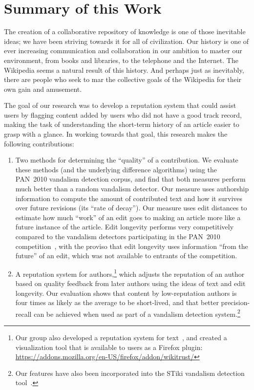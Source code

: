 \section{Summary of this Work}

The creation of a collaborative repository of knowledge is
one of those inevitable ideas; we have been striving towards it
for all of civilization.
Our history is one of ever increasing communication and collaboration
in our ambition to master our environment, from books and libraries,
to the telephone and the Internet.
The Wikipedia seems a natural result of this history.
And perhaps just as inevitably, there are people who seek to
mar the collective goals of the Wikipedia for their own gain and amusement.

The goal of our research was to develop a reputation system
that could assist users by flagging content added by users who
did not have a good track record, making the task of understanding
the short-term history of an article easier to grasp with a glance.
In working towards that goal, this research makes the following contributions:
\begin{enumerate}

\item Two methods for determining the ``quality'' of a contribution.
  We evaluate these methods (and the underlying difference algorithms)
  using the PAN~2010 vandalism detection corpus, and find that both
  measures perform much better than a random vandalism detector.
  Our  measure uses authorship information to
  compute the amount of contributed text and how it survives over
  future revisions (its ``rate of decay'').
  Our  measure uses edit distances to estimate
  how much ``work'' of an edit goes to making an article more like a
  future instance of the article.
  Edit longevity performs very competitively
  compared to the vandalism detectors participating in the
  PAN~2010 competition~\cite{Potthast2010b}, with the proviso that
  edit longevity uses information ``from the future'' of an edit,
  which was not available to entrants of the competition.

\item A reputation system for authors,\footnote{Our group also
  developed a reputation system for text~\cite{Adler2008b},
  and created a visualization
  tool that is available to users as a Firefox plugin:
  \url{https://addons.mozilla.org/en-US/firefox/addon/wikitrust/}}
  which adjusts the reputation of an author based on quality feedback
  from later authors using the ideas of text and edit longevity.
  Our evaluation shows that content by low-reputation authors is
  four times as likely as the average to be short-lived, and that better
  precision-recall can be achieved when used as part of a vandalism
  detection system.\footnote{Our features have also been incorporated
  into the STiki vandalism detection tool~\cite{wiki:STiki}.}

\end{enumerate}


